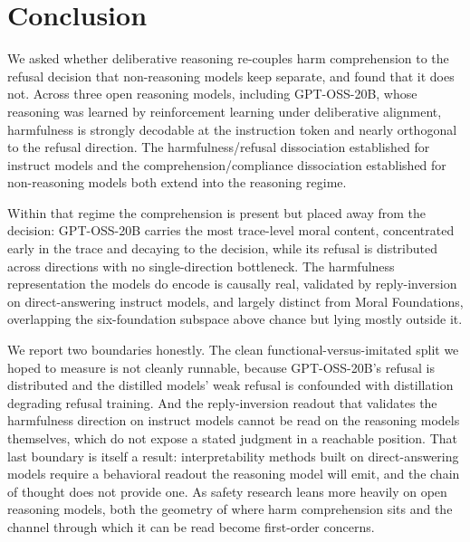 \section{Conclusion}\label{conclusion}

We asked whether deliberative reasoning re-couples harm comprehension to the refusal
decision that non-reasoning models keep separate, and found that it does not. Across
three open reasoning models, including GPT-OSS-20B, whose reasoning was learned by
reinforcement learning under deliberative alignment, harmfulness is strongly
decodable at the instruction token and nearly orthogonal to the refusal direction.
The harmfulness/refusal dissociation established for instruct models
\citep{zhao2025harmfulness} and the comprehension/compliance dissociation
established for non-reasoning models \citep{reblitzrichardson2026crossmodel} both
extend into the reasoning regime.

Within that regime the comprehension is present but placed away from the decision:
GPT-OSS-20B carries the most trace-level moral content, concentrated early in the
trace and decaying to the decision, while its refusal is distributed across
directions with no single-direction bottleneck. The harmfulness representation the
models do encode is causally real, validated by reply-inversion on direct-answering
instruct models, and largely distinct from Moral Foundations, overlapping the
six-foundation subspace above chance but lying mostly outside it.

We report two boundaries honestly. The clean functional-versus-imitated split we
hoped to measure is not cleanly runnable, because GPT-OSS-20B's refusal is
distributed and the distilled models' weak refusal is confounded with distillation
degrading refusal training. And the reply-inversion readout that validates the
harmfulness direction on instruct models cannot be read on the reasoning models
themselves, which do not expose a stated judgment in a reachable position. That last
boundary is itself a result: interpretability methods built on direct-answering
models require a behavioral readout the reasoning model will emit, and the chain of
thought does not provide one. As safety research leans more heavily on open
reasoning models, both the geometry of where harm comprehension sits and the channel
through which it can be read become first-order concerns.
